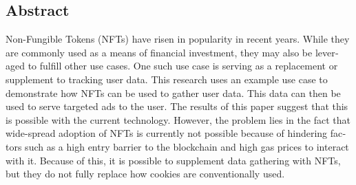 

\begin{otherlanguage}{american}
	\chapter*{Abstract}
	Non-Fungible Tokens (NFTs) have risen in popularity in recent years. While they are commonly used as a means of financial investment, they may also be leveraged to fulfill other use cases. One such use case is serving as a replacement or supplement to tracking user data. This research uses an example use case to demonstrate how NFTs can be used to gather user data. This data can then be used to serve targeted ads to the user. The results of this paper suggest that this is possible with the current technology. However, the problem lies in the fact that wide-spread adoption of NFTs is currently not possible because of hindering factors such as a high entry barrier to the blockchain and high gas prices to interact with it. Because of this, it is possible to supplement data gathering with NFTs, but they do not fully replace how cookies are conventionally used.
\end{otherlanguage}